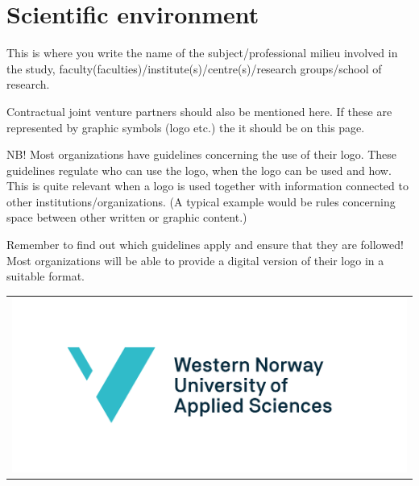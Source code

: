 \chapter{Scientific environment}

This is where you write the name of the subject/professional milieu involved in the study, faculty(faculties)/institute(s)/centre(s)/research groups/school of research.

Contractual joint venture partners should also be mentioned here. If these are represented by graphic symbols (logo etc.) the it should be on this page.

NB! Most organizations have guidelines concerning the use of their logo. These guidelines regulate who can use the logo, when the logo can be used and how. This is quite relevant when a logo is used together with information connected to other institutions/organizations. (A typical example would be rules concerning space between other written or graphic content.)

Remember to find out which guidelines apply and ensure that they are followed!
Most organizations will be able to provide a digital version of their logo in a suitable format.

\hspace{8em}
\begin{tabular}{l}
  \includegraphics[scale=0.36, center]{logos/hvl_logo.pdf}\\
\end{tabular}
